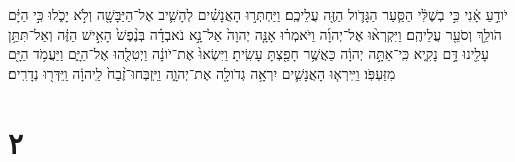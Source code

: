 \documentclass{openreader}
\begin{document}
יֹודֵ֣עַ אָ֔נִי כִּ֣י בְשֶׁלִּ֔י הַסַּ֧עַר הַגָּדֹ֛ול הַזֶּ֖ה עֲלֵיכֶֽם׃ וַיַּחְתְּר֣וּ הָאֲנָשִׁ֗ים לְהָשִׁ֛יב אֶל־הַיַּבָּשָׁ֖ה וְלֹ֣א יָכֹ֑לוּ כִּ֣י הַיָּ֔ם הֹולֵ֥ךְ וְסֹעֵ֖ר עֲלֵיהֶֽם׃ וַיִּקְרְא֨וּ אֶל־יְהוָ֜ה וַיֹּאמְר֗וּ אָנָּ֤ה יְהוָה֙ אַל־נָ֣א נֹאבְדָ֗ה בְּנֶ֨פֶשׁ֙ הָאִ֣ישׁ הַזֶּ֔ה וְאַל־תִּתֵּ֥ן עָלֵ֖ינוּ דָּ֣ם נָקִ֑יא כִּֽי־אַתָּ֣ה יְהוָ֔ה כַּאֲשֶׁ֥ר חָפַ֖צְתָּ עָשִֽׂיתָ׃ וַיִּשְׂאוּ֙ אֶת־יֹונָ֔ה וַיְטִלֻ֖הוּ אֶל־הַיָּ֑ם וַיַּעֲמֹ֥ד הַיָּ֖ם מִזַּעְפֹּֽו׃ וַיִּֽירְא֧וּ הָאֲנָשִׁ֛ים יִרְאָ֥ה גְדֹולָ֖ה אֶת־יְהוָ֑ה וַיִּֽזְבְּחוּ־זֶ֨בַח֙ לַֽיהוָ֔ה וַֽיִּדְּר֖וּ נְדָרִֽים׃ \section*{۲}
\end{document}
